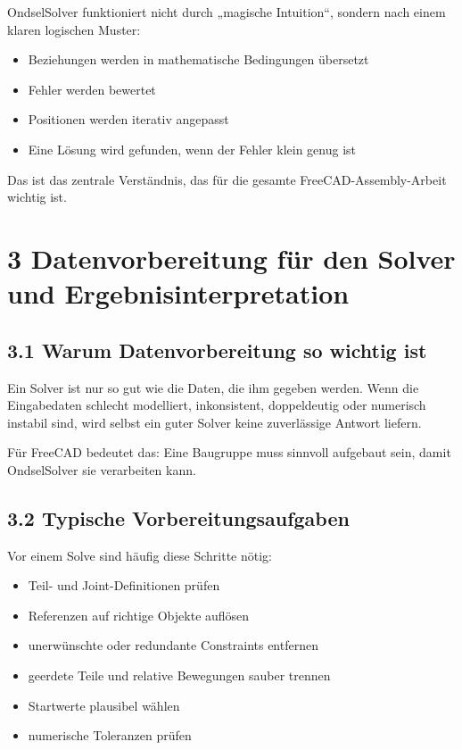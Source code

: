 \documentclass[
  12pt
]{book}
\providecommand{\tightlist}{%
  \setlength{\itemsep}{0pt}\setlength{\parskip}{0pt}}
\begin{document}
OndselSolver funktioniert nicht durch „magische Intuition``, sondern
nach einem klaren logischen Muster:

\begin{itemize}
\tightlist
\item
  Beziehungen werden in mathematische Bedingungen übersetzt
\item
  Fehler werden bewertet
\item
  Positionen werden iterativ angepasst
\item
  Eine Lösung wird gefunden, wenn der Fehler klein genug ist
\end{itemize}

Das ist das zentrale Verständnis, das für die gesamte
FreeCAD-Assembly-Arbeit wichtig ist.

\hypertarget{kap-datenvorbereitung}{%
\chapter{\texorpdfstring{{3} Datenvorbereitung für den Solver und
Ergebnisinterpretation}{3 Datenvorbereitung für den Solver und Ergebnisinterpretation}}\label{kap-datenvorbereitung}}

\hypertarget{warum-datenvorbereitung-so-wichtig-ist}{%
\section{\texorpdfstring{{3.1} Warum Datenvorbereitung so wichtig
ist}{3.1 Warum Datenvorbereitung so wichtig ist}}\label{warum-datenvorbereitung-so-wichtig-ist}}

Ein Solver ist nur so gut wie die Daten, die ihm gegeben werden. Wenn
die Eingabedaten schlecht modelliert, inkonsistent, doppeldeutig oder
numerisch instabil sind, wird selbst ein guter Solver keine zuverlässige
Antwort liefern.

Für FreeCAD bedeutet das: Eine Baugruppe muss sinnvoll aufgebaut sein,
damit OndselSolver sie verarbeiten kann.

\hypertarget{typische-vorbereitungsaufgaben}{%
\section{\texorpdfstring{{3.2} Typische
Vorbereitungsaufgaben}{3.2 Typische Vorbereitungsaufgaben}}\label{typische-vorbereitungsaufgaben}}

Vor einem Solve sind häufig diese Schritte nötig:

\begin{itemize}
\tightlist
\item
  Teil- und Joint-Definitionen prüfen
\item
  Referenzen auf richtige Objekte auflösen
\item
  unerwünschte oder redundante Constraints entfernen
\item
  geerdete Teile und relative Bewegungen sauber trennen
\item
  Startwerte plausibel wählen
\item
  numerische Toleranzen prüfen
\end{itemize}
\end{document}
